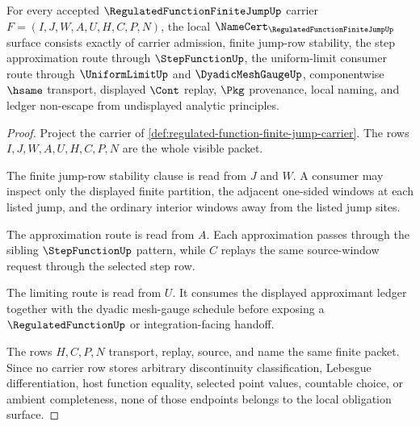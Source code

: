 \begin{theorem}
\label{thm:regulated-function-finite-jump-namecert-obligations}
For every accepted $\RegulatedFunctionFiniteJumpUp$ carrier $F=(I,J,W,A,U,H,C,P,N)$, the local $\NameCert_{\RegulatedFunctionFiniteJumpUp}$ surface consists exactly of carrier admission, finite jump-row stability, the step approximation route through $\StepFunctionUp$, the uniform-limit consumer route through $\UniformLimitUp$ and $\DyadicMeshGaugeUp$, componentwise $\hsame$ transport, displayed $\Cont$ replay, $\Pkg$ provenance, local naming, and ledger non-escape from undisplayed analytic principles.
\end{theorem}
\begin{proof}
Project the carrier of \autoref{def:regulated-function-finite-jump-carrier}. The rows $I,J,W,A,U,H,C,P,N$ are the whole visible packet.

The finite jump-row stability clause is read from $J$ and $W$. A consumer may inspect only the displayed finite partition, the adjacent one-sided windows at each listed jump, and the ordinary interior windows away from the listed jump sites.

The approximation route is read from $A$. Each approximation passes through the sibling $\StepFunctionUp$ pattern, while $C$ replays the same source-window request through the selected step row.

The limiting route is read from $U$. It consumes the displayed approximant ledger together with the dyadic mesh-gauge schedule before exposing a $\RegulatedFunctionUp$ or integration-facing handoff.

The rows $H,C,P,N$ transport, replay, source, and name the same finite packet. Since no carrier row stores arbitrary discontinuity classification, Lebesgue differentiation, host function equality, selected point values, countable choice, or ambient completeness, none of those endpoints belongs to the local obligation surface.
\end{proof}

